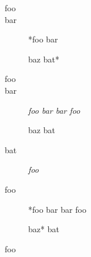 
\def\mytitle{Definition Lists}


\begin{description}
\item[foo]

\item[bar]

*foo bar

baz bat*

\item[foo]

\item[bar]

\emph{foo bar
bar foo}

baz bat

\item[bat]

\emph{foo}

\item[foo]

*foo bar
bar foo

baz* bat
\end{description}

foo



